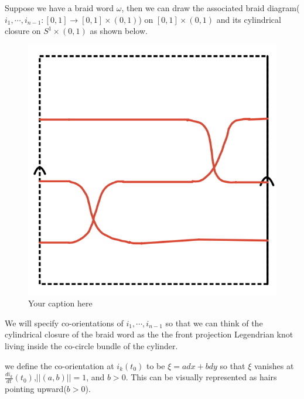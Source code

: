 Suppose we have a braid word $\omega$, then we can draw the associated braid diagram($i_1,\cdots, i_{n -1}: [0,1]\rightarrow [0,1] \times (0,1)$) on $[0,1] \times(0,1)$ and its cylindrical closure on $S^1 \times (0,1)$ as shown below.
\begin{figure}[H] %
    \centering
    \includegraphics[scale = 0.95]{diagrams/natural_alternating_diagrams/2.png} %
    \caption{Your caption here}
    \label{fig:your-label}
\end{figure}


We will specify co-orientations of $i_1, \cdots, i_{n-1}$ so that we can think of the cylindrical closure of the braid word as the the front projection Legendrian knot living inside the co-circle bundle of the cylinder.

we define the co-orientation at $i_k(t_0)$ to be $\xi = adx + bdy$ so that $\xi$ vanishes at $\frac{di_k}{dt}(t_0)$,$||(a,b)||= 1$, and $b>0$. This can be visually represented as hairs pointing upward($b>0$).

